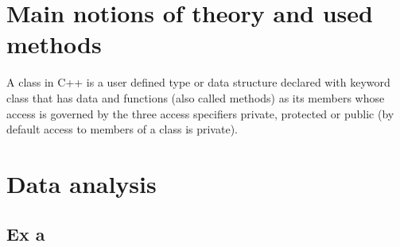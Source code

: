 \documentclass{article}
\begin{document}
	\section{Main notions of theory and used methods}
		A class in C++ is a user defined type or data structure declared with keyword class that has data and functions (also called methods) as its members whose access is governed by the three access specifiers private, protected or public (by default access to members of a class is private).
	\pagebreak

	\section{Data analysis}
		\subsection{Ex a}
			
\end{document}
